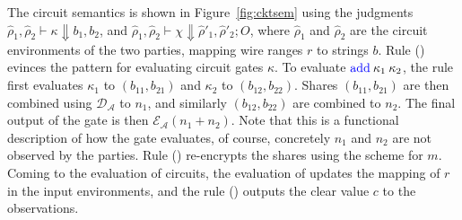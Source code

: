 The circuit semantics is shown in Figure~\ref{fig:cktsem} using the
judgments $\widehat{\rho}_{1}, \widehat{\rho}_{2} \vdash \kappa
\Downarrow b_{1}, b_{2}$, and $\widehat{\rho}_{1}, \widehat{\rho}_{2}
\vdash \chi \Downarrow \widehat{\rho}'_{1}, \widehat{\rho}'_{2}; O$,
where $\widehat{\rho}_{1}$ and $\widehat{\rho}_{2}$ are the circuit
environments of the two parties, mapping wire ranges $r$ to strings
$b$. Rule ({}) evinces the pattern for evaluating circuit
gates $\kappa$. To evaluate $\kw{add}\:\kappa_{1}\:\kappa_{2}$, the
rule first evaluates $\kappa_{1}$ to $(b_{11}, b_{21})$ and
$\kappa_{2}$ to $(b_{12}, b_{22})$. Shares $(b_{11}, b_{21})$ are then
combined using $\mathcal{D_{\mathcal{A}}}$ to $n_{1}$, and similarly
$(b_{12}, b_{22})$ are combined to $n_{2}$. The final output of the
 gate is then $\mathcal{E}_{\mathcal{A}}(n_{1} + n_{2})$. Note
that this is a functional description of how the  gate
evaluates, of course, concretely $n_{1}$ and $n_{2}$ are not observed
by the parties. Rule ({}) re-encrypts the shares using the
scheme for $m$. Coming to the evaluation of circuits, the evaluation
of  updates the mapping of $r$ in the input environments, and
the rule ({}) outputs the clear value $c$ to the
observations.




